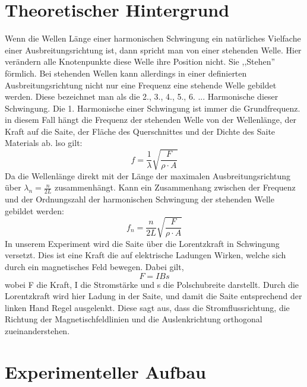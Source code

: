 \documentclass[11pt, a4Paper]{article}
\begin{document}
\section{Theoretischer Hintergrund}
Wenn die Wellen Länge einer harmonischen Schwingung ein natürliches Vielfache einer Ausbreitungsrichtung ist, dann spricht man von einer stehenden Welle. Hier verändern alle Knotenpunkte diese Welle ihre Position nicht. Sie ,,Stehen'' förmlich. Bei stehenden Wellen kann allerdings in einer definierten Ausbreitungsrichtung nicht nur eine Frequenz eine stehende Welle gebildet werden. Diese bezeichnet man als die 2., 3., 4., 5., 6. ... Harmonische dieser Schwingung. Die 1. Harmonische einer Schwingung ist immer die Grundfrequenz. in diesem Fall hängt die Frequenz der stehenden Welle von der Wellenlänge, der Kraft auf die Saite, der Fläche des Querschnittes und der Dichte des Saite Materials ab. lso gilt: $$f=\frac{1}{\lambda}\sqrt{\frac{F}{\rho\cdot A}}$$ Da die Wellenlänge direkt mit der Länge der maximalen Ausbreitungsrichtung über $\lambda_n=\frac{n}{2L}$ zusammenhängt. Kann ein Zusammenhang zwischen der Frequenz und der Ordnungszahl der harmonischen Schwingung der stehenden Welle gebildet werden: $$f_n=\frac{n}{2L}\sqrt{\frac{F}{\rho\cdot A}}$$ In unserem Experiment wird die Saite über die Lorentzkraft in Schwingung versetzt. Dies ist eine Kraft die auf elektrische Ladungen Wirken, welche sich durch ein magnetisches Feld bewegen. Dabei gilt, $$F=IBs$$ wobei F die Kraft, I die Stromstärke und s die Polschubreite darstellt. Durch die Lorentzkraft wird hier Ladung in der Saite, und damit die Saite entsprechend der linken Hand Regel ausgelenkt. Diese sagt aus, dass die Stromflussrichtung, die Richtung der Magnetischfeldlinien und die Auslenkrichtung orthogonal zueinanderstehen.

\section{Experimenteller Aufbau}
\end{document}
